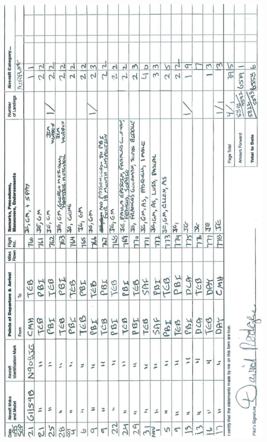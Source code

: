 \documentclass[10pt]{article}
\begin{document}
\includegraphics[max width=\textwidth, center]{2025_02_27_dd68c3d38de88f0516d9g-042}\\
\end{document}
